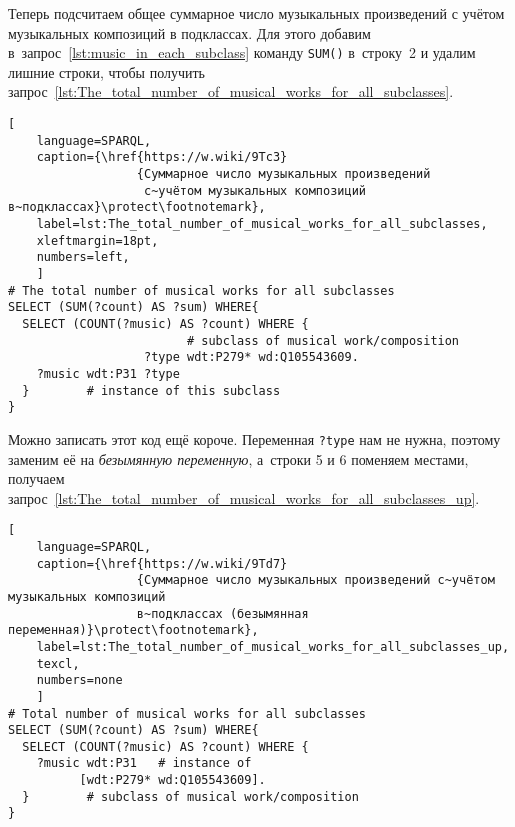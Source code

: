 Теперь подсчитаем общее суммарное число музыкальных произведений с учётом музыкальных композиций в подклассах. Для этого добавим в~запрос~\ref{lst:music_in_each_subclass} команду \lstinline|SUM()| в~строку~2 и удалим лишние строки, чтобы получить запрос~\ref{lst:The_total_number_of_musical_works_for_all_subclasses}.


\begin{lstlisting}[ 
    language=SPARQL,
    caption={\href{https://w.wiki/9Tc3}
                  {Суммарное число музыкальных произведений 
                   с~учётом музыкальных композиций в~подклассах}\protect\footnotemark},
    label=lst:The_total_number_of_musical_works_for_all_subclasses,
    xleftmargin=18pt,
    numbers=left,
    ]
# The total number of musical works for all subclasses 
SELECT (SUM(?count) AS ?sum) WHERE{
  SELECT (COUNT(?music) AS ?count) WHERE {
                         # subclass of musical work/composition
                   ?type wdt:P279* wd:Q105543609.
    ?music wdt:P31 ?type
  }        # instance of this subclass
}
\end{lstlisting}%

Можно записать этот код ещё короче. 
Переменная \lstinline|?type| нам не нужна, 
поэтому заменим её на \emph{безымянную переменную}, 
а~строки 5 и 6 поменяем местами, 
получаем запрос~\ref{lst:The_total_number_of_musical_works_for_all_subclasses_up}.

\begin{lstlisting}[ 
    language=SPARQL,
    caption={\href{https://w.wiki/9Td7}
                  {Суммарное число музыкальных произведений с~учётом музыкальных композиций 
                  в~подклассах (безымянная переменная)}\protect\footnotemark},
    label=lst:The_total_number_of_musical_works_for_all_subclasses_up,
    texcl,
    numbers=none
    ]
# Total number of musical works for all subclasses
SELECT (SUM(?count) AS ?sum) WHERE{
  SELECT (COUNT(?music) AS ?count) WHERE {
    ?music wdt:P31   # instance of
          [wdt:P279* wd:Q105543609].
  }        # subclass of musical work/composition
}
\end{lstlisting}%

